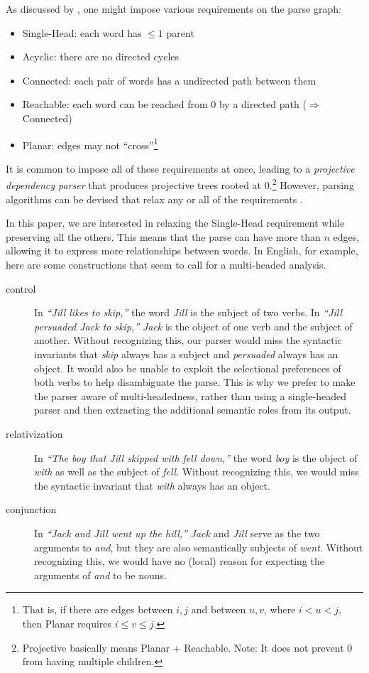 \documentclass[11pt]{article}
\begin{document}
As discussed by , one might impose various requirements on the parse graph:
\begin{itemize}[noitemsep]
\item {\sc Single-Head}: each word has $\leq 1$ parent
\item {\sc Acyclic}: there are no directed cycles
\item {\sc Connected}: each pair of words has a undirected path between them
\item {\sc Reachable}: each word can be reached from 0 by a directed path ($\Rightarrow$ {\sc Connected})
\item {\sc Planar}: edges may not ``cross''\footnote{That is, if there are edges between $i,j$ and between $u,v$, where $i < u < j$, then {\sc Planar} requires $i \leq v \leq j$.}
\end{itemize}
It is common to impose all of these requirements at once, leading to a {\em projective dependency parser} that produces projective trees rooted at 0.\footnote{{\sc Projective} basically means {\sc Planar} + {\sc Reachable}.  Note: It does not prevent 0 from having multiple children.}  However, parsing algorithms can be devised that relax any or all of the requirements \cite{gomezrodriguez-nivre-2013}.  

In this paper, we are interested in relaxing the {\sc Single-Head} requirement while preserving all the others.  This means that the parse can have more than $n$ edges, allowing it to express more relationships between words.  In English, for example, here are some constructions that seem to call for a multi-headed analysis.  
\begin{description}
\item[control] In {\em ``Jill likes to skip,''} the word {\em Jill} is the subject of two verbs.  In {\em ``Jill persuaded Jack to skip,''} {\em Jack} is the object of one verb and the subject of another.  Without recognizing this, our parser would miss the syntactic invariants that {\em skip} always has a subject and {\em persuaded} always has an object.  It would also be unable to exploit the selectional preferences of both verbs to help disambiguate the parse.  This is why we prefer to make the parser aware of multi-headedness, rather than using a single-headed parser and then extracting the additional semantic roles from its output.
\item[relativization] In {\em ``The boy that Jill skipped with fell down,''} the word {\em boy} is the object of {\em with} as well as the subject of {\em fell}.  Without recognizing this, we would miss the syntactic invariant that {\em with} always has an object.  
\item[conjunction] In {\em ``Jack and Jill went up the hill,''} {\em Jack} and {\em Jill} serve as the two arguments to {\em and}, but they are also semantically subjects of {\em went}.  Without recognizing this, we would have no (local) reason for expecting the arguments of {\em and} to be nouns.
\end{description}
\end{document}
